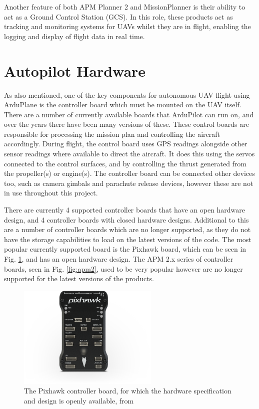 Another feature of both APM Planner 2 and MissionPlanner is their ability to act as a Ground Control Station (GCS). In this role, these products act as tracking and monitoring systems for UAVs whilst they are in flight, enabling the logging and display of flight data in real time. 

\section{Autopilot Hardware} 
\label{intro:hardware}

As also mentioned, one of the key components for autonomous UAV flight using ArduPlane is the controller board which must be mounted on the UAV itself. There are a number of currently available boards that ArduPilot can run on, and over the years there have been many versions of these. These control boards are responsible for processing the mission plan and controlling the aircraft accordingly. During flight, the control board uses GPS readings alongside other sensor readings where available to direct the aircraft. It does this using the servos connected to the control surfaces, and by controlling the thrust generated from the propeller(s) or engine(s). The controller board can be connected other devices too, such as camera gimbals and parachute release devices, however these are not in use throughout this project. 

There are currently 4 supported controller boards that have an open hardware design, and 4 controller boards with closed hardware designs. Additional to this are a number of controller boards which are no longer supported, as they do not have the storage capabilities to load on the latest versions of the code. The most popular currently supported board is the Pixhawk board, which can be seen in Fig. \ref{fig:pixhawk}, and has an open hardware design. The APM 2.x series of controller boards, seen in Fig. \ref{fig:apm2}, used to be very popular however are no longer supported for the latest versions of the products.

\begin{figure}[htbp!] 
\centering    
\includegraphics[width=0.6\textwidth]{Pixhawk}
\caption[Pixhawk controller board]{The Pixhawk controller board, for which the hardware specification and design is openly available, from \cite{Pixhawk}}
\label{fig:pixhawk}
\end{figure}

